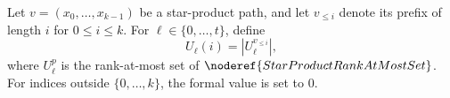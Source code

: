 \begin{definition}
Let \(v=(x_0,\ldots,x_{k-1})\) be a star-product path, and let
\(v_{\le i}\) denote its prefix of length \(i\) for \(0\le i\le k\).  For
\(\ell\in\{0,\ldots,t\}\), define
\[
  U_\ell(i)=|U_\ell^{v_{\le i}}|,
\]
where \(U_\ell^p\) is the rank-at-most set of
\(\noderef{StarProductRankAtMostSet}\).  For indices outside
\(\{0,\ldots,k\}\), the formal value is set to \(0\).
\end{definition}
